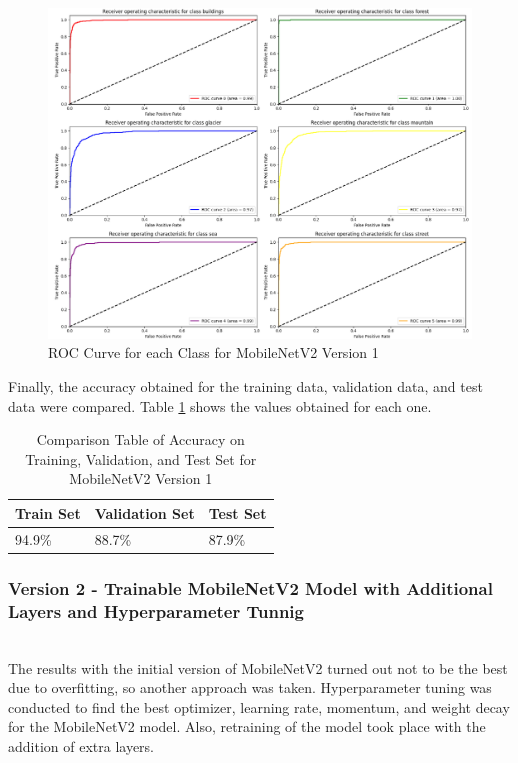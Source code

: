 \documentclass[conference]{IEEEtran}
\begin{document}
\begin{figure}[H]
    \centering
    \includegraphics[width=0.9\linewidth]{images/rocCurvesMobileNetV2_1.png}
    \caption{ROC Curve for each Class for MobileNetV2 Version 1}
    \label{fig:RocCurvesMobileNetV2_1}
\end{figure}

Finally, the accuracy obtained for the training data, validation data, and test data were compared. Table \ref{tab:accMobileNetV2_1} shows the values obtained for each one.

\begin{table}[H]
    \centering
    \caption{Comparison Table of Accuracy on Training, Validation, and Test Set for MobileNetV2 Version 1}
    \renewcommand{\arraystretch}{1.5}
    \begin{tabularx}{0.8\linewidth}{|X|X|X|}
    \hline
    \cellcolor[HTML]{EFEFEF}\textbf{Train Set} & \cellcolor[HTML]{EFEFEF}\textbf{Validation Set} & \cellcolor[HTML]{EFEFEF}\textbf{Test Set} \\ \hline
     94.9\%  & 88.7\%  & 87.9\%\\ \hline
    \end{tabularx}
    \label{tab:accMobileNetV2_1}
\end{table}


\subsubsection{Version 2 - Trainable MobileNetV2 Model with Additional Layers and Hyperparameter Tunnig}
\hfill\\

The results with the initial version of MobileNetV2 turned out not to be the best due to overfitting, so another approach was taken. Hyperparameter tuning was conducted to find the best optimizer, learning rate, momentum, and weight decay for the MobileNetV2 model. Also, retraining of the model took place with the addition of extra layers.
\end{document}
